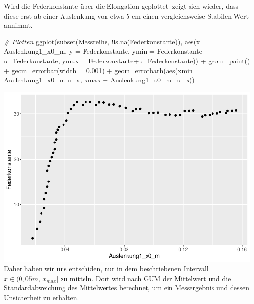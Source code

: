 \documentclass[
]{article}
\newenvironment{Shaded}{\begin{snugshade}}{\end{snugshade}}
\newcommand{\AttributeTok}[1]{\textcolor[rgb]{0.77,0.63,0.00}{#1}}
\newcommand{\CommentTok}[1]{\textcolor[rgb]{0.56,0.35,0.01}{\textit{#1}}}
\newcommand{\FloatTok}[1]{\textcolor[rgb]{0.00,0.00,0.81}{#1}}
\newcommand{\FunctionTok}[1]{\textcolor[rgb]{0.00,0.00,0.00}{#1}}
\newcommand{\NormalTok}[1]{#1}
\newcommand{\SpecialCharTok}[1]{\textcolor[rgb]{0.00,0.00,0.00}{#1}}
\begin{document}
Wird die Federkonstante über die Elongation geplottet, zeigt sich
wieder, dass diese erst ab einer Auslenkung von etwa 5 cm einen
vergleichsweise Stabilen Wert annimmt.

\begin{Shaded}
\begin{Highlighting}[]
\CommentTok{\# Plotten}
\FunctionTok{ggplot}\NormalTok{(}\FunctionTok{subset}\NormalTok{(Messreihe, }\SpecialCharTok{!}\FunctionTok{is.na}\NormalTok{(Federkonstante)), }\FunctionTok{aes}\NormalTok{(}\AttributeTok{x =}\NormalTok{ Auslenkung1\_x0\_m, }
                                                      \AttributeTok{y =}\NormalTok{ Federkonstante,}
                                                      \AttributeTok{ymin =}\NormalTok{ Federkonstante}\SpecialCharTok{{-}}\NormalTok{u\_Federkonstante,}
                                                      \AttributeTok{ymax =}\NormalTok{ Federkonstante}\SpecialCharTok{+}\NormalTok{u\_Federkonstante)) }\SpecialCharTok{+} 
  \FunctionTok{geom\_point}\NormalTok{() }\SpecialCharTok{+} 
  \FunctionTok{geom\_errorbar}\NormalTok{(}\AttributeTok{width =} \FloatTok{0.001}\NormalTok{) }\SpecialCharTok{+}
  \FunctionTok{geom\_errorbarh}\NormalTok{(}\FunctionTok{aes}\NormalTok{(}\AttributeTok{xmin =}\NormalTok{ Auslenkung1\_x0\_m}\SpecialCharTok{{-}}\NormalTok{u\_x,}
                     \AttributeTok{xmax =}\NormalTok{ Auslenkung1\_x0\_m}\SpecialCharTok{+}\NormalTok{u\_x))}
\end{Highlighting}
\end{Shaded}

\includegraphics{DehnbareStoffe_files/figure-latex/unnamed-chunk-8-1.pdf}
Daher haben wir uns entschiden, nur in dem beschriebenen Intervall
\(x \in (0,05m,\ x_{max}]\) zu mitteln. Dort wird nach GUM der
Mittelwert und die Standardabweichung des Mittelwertes berechnet, um ein
Messergebnis und dessen Unsicherheit zu erhalten.
\end{document}
